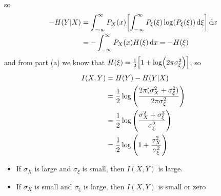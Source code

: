 \documentclass[../main.tex]{subfiles}
\begin{document}
so
\begin{align*}
    -H(Y|X) &= \int_{-\infty}^\infty P_X(x) \qt[\int_{-\infty}^\infty P_\xi(\xi) \log(P_\xi(\xi)) \dd{\xi}] \dd{x} \\
    &= -\int_{-\infty}^\infty P_X(x) H(\xi) \dd{x} = -H(\xi)
\end{align*}
and from part (a) we know that $H(\xi) = \frac{1}{2} \qt[1 + \log(2\pi\sigma_\xi^2)]$, so
\begin{align*}
    I(X,Y) &= H(Y) - H(Y|X) \\
    &= \frac{1}{2} \log\qt(\frac{2\pi(\sigma_X^2 + \sigma_\xi^2)}{2\pi\sigma_\xi^2}) \\
    &= \frac{1}{2} \log\qt(\frac{\sigma_X^2 + \sigma_\xi^2}{\sigma_\xi^2}) \\
    &= \frac{1}{2} \log\qt(1 + \frac{\sigma_X^2}{\sigma_\xi^2})
\end{align*}
\begin{itemize}
    \item If $\sigma_X$ is large and $\sigma_\xi$ is small, then $I(X,Y)$ is large.
    \item If $\sigma_X$ is small and $\sigma_\xi$ is large, then $I(X,Y)$ is small or zero
\end{itemize}
\end{document}
